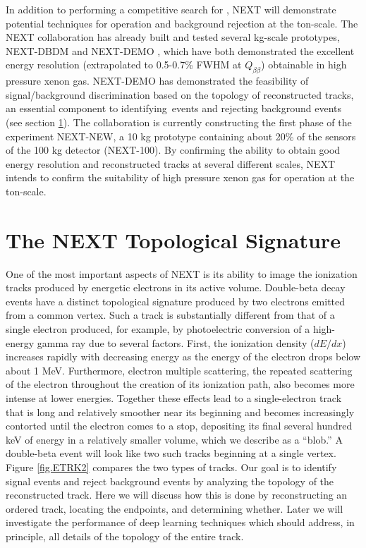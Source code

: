 \documentclass{JINST}
\begin{document}
In addition to performing a competitive search for \bbonu, NEXT will demonstrate potential 
techniques for operation and background rejection at the ton-scale.  The NEXT collaboration has already built and tested several kg-scale prototypes, NEXT-DBDM \cite{Alvarez:2012kua} and
NEXT-DEMO \cite{Alvarez:2012xda,Alvarez:2012kua,Alvarez:2013gxa,Lorca:2014sra}, which have both demonstrated the excellent energy resolution (extrapolated to 0.5-0.7\% FWHM at
$Q_{\beta\beta}$) obtainable in high pressure xenon gas.  NEXT-DEMO has demonstrated the feasibility of signal/background discrimination based on the topology of reconstructed tracks,
an essential component to identifying \bbonu\,events and rejecting background events (see section \ref{sec:topology}).  The collaboration is currently constructing the first phase of the experiment NEXT-NEW, a 10 kg prototype 
containing about 20\% of the sensors of the 100 kg detector (NEXT-100).  By confirming the ability to obtain good energy resolution and reconstructed tracks at several different scales, NEXT 
intends to confirm the suitability of high pressure xenon gas for operation at the ton-scale.

\section{The NEXT Topological Signature}\label{sec:topology}
One of the most important aspects of NEXT is its ability to image the ionization tracks produced by energetic electrons in its active volume.  Double-beta decay events have a distinct
topological signature produced by two electrons emitted from a common vertex.  Such a track is substantially different from that of a single electron produced, for example, by photoelectric
conversion of a high-energy gamma ray due to several factors.  First, the ionization density ($dE/dx$) increases rapidly with decreasing energy as the energy of the electron drops below about 1 MeV.  Furthermore, electron multiple scattering, the repeated scattering of the electron throughout the creation of its ionization path, also becomes more intense at lower energies.  Together
these effects lead to a single-electron track that is long and relatively smoother near its beginning and becomes increasingly contorted until the electron comes to a stop, depositing
its final several hundred keV of energy in a relatively smaller volume, which we describe as a ``blob.''  A double-beta event will look like two such tracks beginning at a single vertex.  Figure \ref{fig.ETRK2} compares the two types of
tracks.  Our goal is to identify signal events and reject background events by analyzing the topology of the reconstructed track.  Here we will discuss how this is done by reconstructing an ordered
track, locating the endpoints, and determining whether.  Later we will investigate the performance of deep learning techniques which should address, in principle, all details of the topology 
of the entire track.
\end{document}

